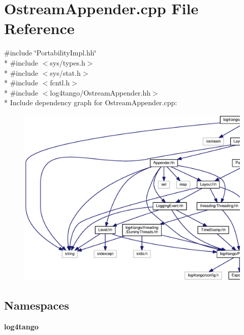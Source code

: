 \section{Ostream\-Appender.\-cpp File Reference}
\label{OstreamAppender_8cpp}
{\ttfamily \#include \char`\"{}Portability\-Impl.\-hh\char`\"{}}\\*
{\ttfamily \#include $<$sys/types.\-h$>$}\\*
{\ttfamily \#include $<$sys/stat.\-h$>$}\\*
{\ttfamily \#include $<$fcntl.\-h$>$}\\*
{\ttfamily \#include $<$log4tango/\-Ostream\-Appender.\-hh$>$}\\*
Include dependency graph for Ostream\-Appender.\-cpp\-:
\nopagebreak
\begin{figure}[H]
\begin{center}
\leavevmode
\includegraphics[width=350pt]{dc/d90/OstreamAppender_8cpp__incl}
\end{center}
\end{figure}
\subsection*{Namespaces}
\begin{DoxyCompactItemize}
\item 
{\bf log4tango}
\end{DoxyCompactItemize}
